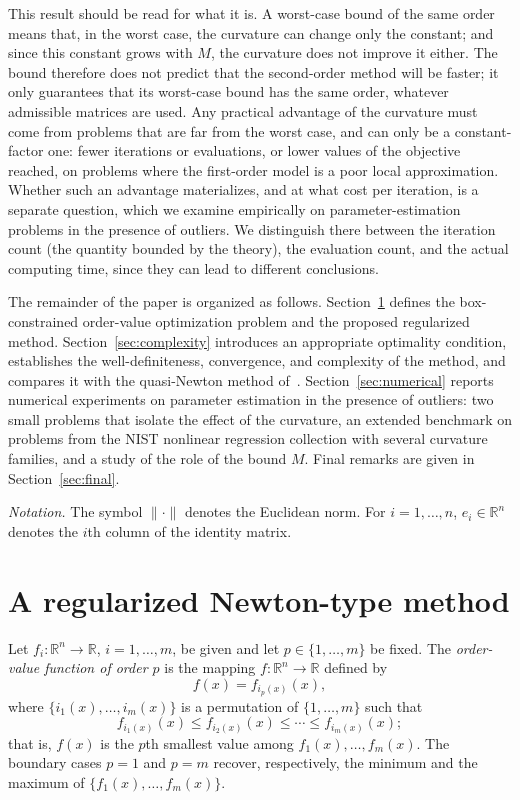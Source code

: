 \documentclass[11pt]{article}
\begin{document}
This result should be read for what it is. A worst-case bound of the same order
means that, in the worst case, the curvature can change only the constant; and
since this constant grows with $M$, the curvature does not improve it either. The bound therefore does not predict that the second-order method will
be faster; it only guarantees that its worst-case bound has the same order,
whatever admissible matrices are used. Any practical advantage of the curvature must come from
problems that are far from the worst case, and can only be a constant-factor
one: fewer iterations or evaluations, or lower values of the objective reached, on problems
where the first-order model is a poor local approximation. Whether such an
advantage materializes, and at what cost per iteration, is a separate question,
which we examine empirically on parameter-estimation problems in the presence
of outliers. We distinguish there between the iteration count (the quantity
bounded by the theory), the evaluation count, and the actual computing time,
since they can lead to different conclusions.

The remainder of the paper is organized as follows. Section~\ref{sec:method}
defines the box-constrained order-value optimization problem and the proposed
regularized method. Section~\ref{sec:complexity} introduces an appropriate
optimality condition, establishes the well-definiteness, convergence, and
complexity of the method, and compares it with the quasi-Newton method
of~\cite{yano1}. Section~\ref{sec:numerical} reports numerical experiments on
parameter estimation in the presence of outliers: two small problems that
isolate the effect of the curvature, an extended benchmark on problems from the
NIST nonlinear regression collection with several curvature families, and a
study of the role of the bound $M$. Final remarks are given in
Section~\ref{sec:final}.

\medskip
\noindent\textit{Notation.} The symbol $\|\cdot\|$ denotes the Euclidean norm.
For $i=1,\dots,n$, $e_i\in\mathbb{R}^{n}$ denotes the $i$th column of the
identity matrix.

\section{A regularized Newton-type method} \label{sec:method}

Let $f_i : \mathbb{R}^n \to \mathbb{R}$, $i = 1, \ldots, m$, be given and let
$p \in \{1, \ldots, m\}$ be fixed. The \textit{order-value function of order
$p$} is the mapping $f : \mathbb{R}^n \to \mathbb{R}$ defined by
\begin{equation}
    f(x) = f_{i_p(x)}(x), \label{ovo-function}
\end{equation}
where $\{i_1(x), \ldots, i_m(x)\}$ is a permutation of $\{1, \ldots, m\}$ such
that
\begin{equation}
    f_{i_1(x)}(x) \leq f_{i_2(x)}(x) \leq \cdots \leq f_{i_m(x)}(x);
    \label{fi-sort}
\end{equation}
that is, $f(x)$ is the $p$th smallest value among $f_1(x), \ldots, f_m(x)$.
The boundary cases $p = 1$ and $p = m$ recover, respectively, the minimum and
the maximum of $\{f_1(x), \ldots, f_m(x)\}$.
\end{document}
